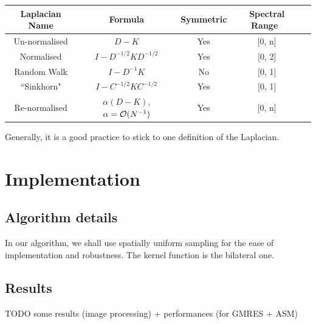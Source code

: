 \begin{table}[!htbp]
 \centering
 \begin{tabular}{|c|c|c|c|c|}
  \hline
  Laplacian Name & Formula & Symmetric & Spectral Range \\
  \hline
  Un-normalised & \(D - K\) & Yes & [0, n] \\
  \hline
  Normalised & \(I - D^{-1/2}KD^{-1/2}\) & Yes & [0, 2] \\
  \hline
  Random Walk & \(I - D^{-1}K\) & No & [0, 1] \\
  \hline
  ``Sinkhorn" \cite{milanfar_symmetrizing_2013} & \(I - C^{-1/2}KC^{-1/2}\) & Yes & [0, 1] \\
  \hline
  Re-normalised \cite{milanfar_new_2016} & \(\alpha(D - K)\), \(\alpha = \operatorname{\mathcal{O}}(N^{-1})\) & Yes & [0, n] \\
  \hline
 \end{tabular}
\end{table}
Generally, it is a good practice to stick to one definition of the Laplacian.

\section{Implementation}

\subsection{Algorithm details}
In our algorithm, we shall use spatially uniform sampling for the ease of implementation and robustness.
The kernel function is the bilateral one.

\subsection{Results}
TODO some results (image processing) + performances (for GMRES + ASM)
